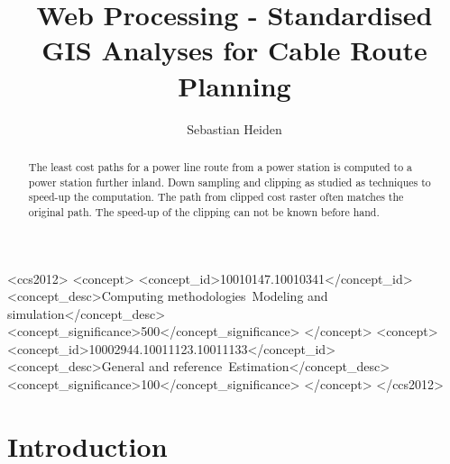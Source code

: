 \documentclass[acmtog]{acmart}
\begin{document}
	\title{Web Processing - Standardised GIS Analyses for Cable Route Planning}
	
	\author{Sebastian Heiden}
	
	
	\renewcommand{\shortauthors}{Heiden}
	
	\begin{abstract}
		The least cost paths for a power line route from a power station is computed to a power station further inland.
		Down sampling and clipping as studied as techniques to speed-up the computation.
		The path from clipped cost raster often matches the original path.
		The speed-up of the clipping can not be known before hand.
	\end{abstract}
	
	\begin{CCSXML}
		<ccs2012>
		<concept>
		<concept_id>10010147.10010341</concept_id>
		<concept_desc>Computing methodologies~Modeling and simulation</concept_desc>
		<concept_significance>500</concept_significance>
		</concept>
		<concept>
		<concept_id>10002944.10011123.10011133</concept_id>
		<concept_desc>General and reference~Estimation</concept_desc>
		<concept_significance>100</concept_significance>
		</concept>
		</ccs2012>
	\end{CCSXML}
	


	
	
	
	\maketitle
	
	\section{Introduction}\label{sec:introduction}
\end{document}
